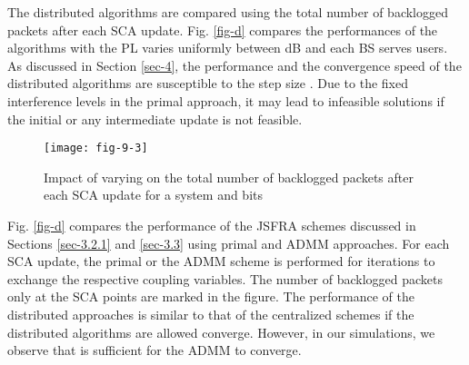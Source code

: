 The distributed algorithms are compared using the total number of backlogged packets after each \ac{SCA} update. Fig. \ref{fig-d} compares the performances of the algorithms with the \ac{PL} varies uniformly between \me{[0,-6]} dB and each \ac{BS} serves  users. As discussed in Section \ref{sec-4}, the performance and the convergence speed of the distributed algorithms are susceptible to the step size . Due to the fixed interference levels in the primal approach, it may lead to infeasible solutions if the initial or any intermediate update is not feasible.
\begin{figure}
	\centering
	\texttt{[image: fig-9-3]}
	\caption{Impact of varying  on the total number of backlogged packets after each \ac{SCA} update for a system  and  bits}
	\label{fig-d-3.1}
\end{figure}

Fig. \ref{fig-d} compares the performance of the \ac{JSFRA} schemes discussed in Sections \ref{sec-3.2.1} and \ref{sec-3.3} using primal and \ac{ADMM} approaches. For each \ac{SCA} update, the primal or the \ac{ADMM} scheme is performed for  iterations to exchange the respective coupling variables. The number of backlogged packets only at the \ac{SCA} points are marked in the figure. The performance of the distributed approaches is similar to that of the centralized schemes if the distributed algorithms are allowed converge. However, in our simulations, we observe that  is sufficient for the \ac{ADMM} to converge. %

